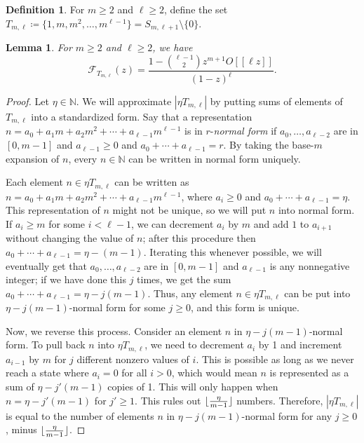 \documentclass{daj}
\newtheorem{lemma}[theorem]{Lemma}
\theoremstyle{definition}
\newtheorem{definition}[theorem]{Definition}
\theoremstyle{remark}
\numberwithin{equation}{section}
\numberwithin{theorem}{section}
\newcommand{\N}{\mathbb{N}}
\newcommand{\calf}{\mathcal{F}}
\DeclarePairedDelimiter{\floor}{\lfloor}{\rfloor}
\begin{document}
\begin{definition}
    For $m\geq 2$ and $\ell  \geq 2$, define the set $T_{m,\ell}\coloneq  \{1,m,m^2,\ldots,m^{\ell-1}\} = S_{m,\ell+1} \setminus \{0\}.$
\end{definition}

\begin{lemma}\label{lemmaHTML}
    For $m\geq 2$ and $\ell \geq 2$, we have 
    \[\calf_{T_{m,\ell}}(z) = \frac{1-\binom{\ell-1}{2}z^{m+1}O[[\ell z]]}{(1-z)^\ell}.\]
\end{lemma}

\begin{proof}
    Let $\eta \in \N$. We will approximate $|\eta T_{m,\ell}|$ by putting sums of elements of $T_{m,\ell}$ into a standardized form. Say that a representation $n = a_0 +a_1m + a_2m^2 + \cdots + a_{\ell-1}m^{\ell-1}$ is in $r$-\emph{normal form} if $a_0,\ldots,a_{\ell-2}$ are in $[0,m-1]$ and $a_{\ell-1} \geq 0$ and $a_0+\cdots + a_{\ell-1} = r$. By taking the base-$m$ expansion of $n$, every $n \in \N$ can be written in normal form uniquely.

    Each element $n \in \eta T_{m,\ell}$ can be written as $n = a_0 +a_1m + a_2m^2 + \cdots + a_{\ell-1}m^{\ell-1}$, where $a_i \geq 0$ and $a_0+\cdots + a_{\ell-1} = \eta $. This representation of $n$ might not be unique, so we will put $n$ into normal form. 
 If $a_i \geq m$ for some $i < \ell -1$, we can decrement $a_i$ by $m$ and add $1$ to $a_{i+1}$ without changing the value of $n$; after this procedure then $a_0+\cdots + a_{\ell-1} = \eta -(m-1)$. Iterating this whenever possible, we will eventually get that $a_0,\ldots,a_{\ell-2}$ are in $[0,m-1]$ and $a_{\ell-1}$ is any nonnegative integer; if we have done this $j$ times, we get the sum $a_0+\cdots + a_{\ell-1} = \eta -j(m-1)$. Thus, any element $n \in \eta T_{m,\ell}$ can be put into $\eta -j(m-1)$-normal form for some $j \geq 0$, and this form is unique.

    Now, we reverse this process. Consider an element $n$ in $\eta -j(m-1)$-normal form. To pull back $n$ into $\eta T_{m,\ell}$, we need to decrement $a_i$ by 1 and increment $a_{i-1}$ by $m$ for $j$ different nonzero values of $i$. This is possible as long as we never reach a state where $a_i = 0$ for all $i>0$, which would mean $n$ is represented as a sum of $\eta -j'(m-1)$ copies of 1. This will only happen when $n = \eta -j'(m-1)$ for $j' \geq 1$. This rules out $\floor{\frac{\eta }{m-1}}$ numbers. Therefore, $|\eta T_{m,\ell}|$ is equal to the number of elements $n$ in $\eta -j(m-1)$-normal form for any $j \geq 0$, minus $\floor{\frac{\eta }{m-1}}$.
    

\end{proof}
\end{document}

